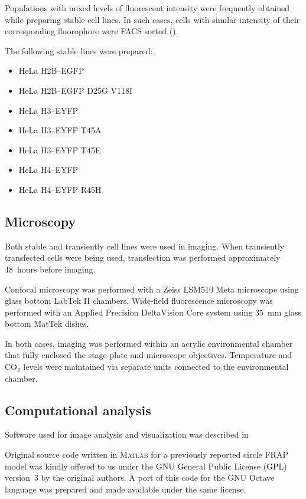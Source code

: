     Populations with mixed levels of fluorescent intensity were frequently
    obtained while preparing stable cell lines. In such cases, cells with
    similar intensity of their corresponding fluorophore were FACS
    sorted ().

    The following stable lines were prepared:

    \begin{itemize}
      \item HeLa H2B--EGFP
      \item HeLa H2B--EGFP D25G V118I
      \item HeLa H3--EYFP
      \item HeLa H3--EYFP T45A
      \item HeLa H3--EYFP T45E
      \item HeLa H4--EYFP
      \item HeLa H4--EYFP R45H
    \end{itemize}

  \subsection{Microscopy}

    Both stable and transiently cell lines were used in imaging. When
    transiently transfected cells were being used, transfection was performed
    approximately 48~hours before imaging.

    Confocal microscopy was performed with a Zeiss LSM510 Meta microscope
    using glass bottom LabTek II chambers. Wide-field fluorescence microscopy
    was performed with an Applied Precision DeltaVision Core system
    using \SI{35}{\mm} glass bottom MatTek dishes.

    In both cases, imaging was performed within an acrylic environmental
    chamber that fully enclosed the stage plate and microscope objectives.
    Temperature and CO$_2$ levels were maintained via separate units connected
    to the environmental chamber.

  \subsection{Computational analysis}

    Software used for image analysis and visualization was described in

    Original source code written in \textsc{Matlab} for a previously
    reported circle FRAP model \citep{mueller2008evidence} was kindly offered
    to us under the GNU General Public License (GPL) version~3 by the
    original authors. A port of this code for the GNU Octave language was
    prepared and made available under the same license.

